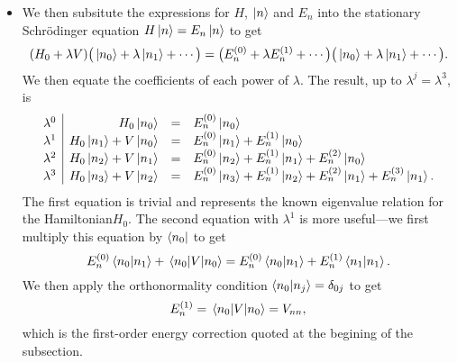\documentclass[11pt, a4paper]{article}
\newcommand{\Schro}{Schr\"{o}dinger\xspace}
\newcommand{\Ham}{Hamiltonian\xspace}
\begin{document}
\begin{itemize}
    \item We then subsitute the expressions for $ H $, $ \ket{n} $ and $ E_{n} $ into the stationary \Schro equation $ H \ket{n} = E_{n} \ket{n} $ to get
    \begin{equation*}
        (H_{0} + \lambda V)\big( \ket{n_{0}} + \lambda \ket{n_{1}}  + \cdots \big) = \big( E_{n}^{(0)} + \lambda E_{n}^{(1)} + \cdots \big)\big( \ket{n_{0}} + \lambda \ket{n_{1}} + \cdots \big).
    \end{equation*}
    We then equate the coefficients of each power of $ \lambda $. The result, up to $ \lambda^{j} = \lambda^{3} $, is
    \begin{equation*}
        \begin{array}{l|r c l}
            \lambda^{0} & H_{0} \ket{n_{0}} & = & E_{n}^{(0)} \ket{n_{0}}\\
            \lambda^{1} & H_{0}\ket{n_{1}} + V \ket{n_{0}} & = & E_{n}^{(0)}\ket{n_{1}} + E_{n}^{(1)}\ket{n_{0}}\\
            \lambda^{2} & H_{0}\ket{n_{2}} + V \ket{n_{1}} & = & E_{n}^{(0)}\ket{n_{2}} + E_{n}^{(1)}\ket{n_{1}} + E_{n}^{(2)}\ket{n_{0}}\\
            \lambda^{3} & H_{0}\ket{n_{3}} + V \ket{n_{2}} & = & E_{n}^{(0)}\ket{n_{3}} + E_{n}^{(1)}\ket{n_{2}} + E_{n}^{(2)}\ket{n_{1}} + E_{n}^{(3)}\ket{n_{1}}.
        \end{array}
    \end{equation*}
    The first equation is trivial and represents the known eigenvalue relation for the \Ham $ H_{0} $. The second equation with $ \lambda^{1} $ is more useful---we first multiply this equation by $ \bra{n_{0}} $ to get
    \begin{equation*}
        E_{n}^{(0)} \braket{n_{0}}{n_{1}} + \mel{n_{0}}{V}{n_{0}} = E_{n}^{(0)}\braket{n_{0}}{n_{1}} + E_{n}^{(1)}\braket{n_{1}}{n_{1}}.
    \end{equation*}
     We then apply the orthonormality condition $ \braket{n_{0}}{n_{j}} = \delta_{0j} $ to get 
     \begin{equation*}
         E_{n}^{(1)} = \mel{n_{0}}{V}{n_{0}} = V_{nn},
     \end{equation*}
     which is the first-order energy correction quoted at the begining of the subsection.

\end{itemize}
\end{document}
